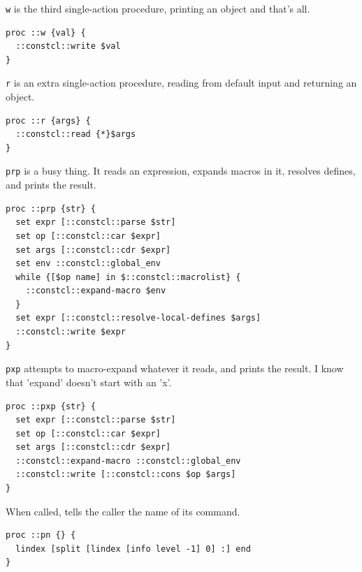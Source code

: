 \documentclass[twoside,9pt]{report}
\begin{document}
\texttt{w} is the third single-action procedure, printing an object and that's all.

\noindent\makebox[\linewidth]{\rule{\linewidth}{0.4pt}}
\begin{lstlisting}
proc ::w {val} {
  ::constcl::write $val
}
\end{lstlisting}
\noindent\makebox[\linewidth]{\rule{\linewidth}{0.4pt}}

\texttt{r} is an extra single-action procedure, reading from default input and returning an object.

\noindent\makebox[\linewidth]{\rule{\linewidth}{0.4pt}}
\begin{lstlisting}
proc ::r {args} {
  ::constcl::read {*}$args
}
\end{lstlisting}
\noindent\makebox[\linewidth]{\rule{\linewidth}{0.4pt}}

\texttt{prp} is a busy thing. It reads an expression, expands macros in it, resolves defines, and prints the result.

\noindent\makebox[\linewidth]{\rule{\linewidth}{0.4pt}}
\begin{lstlisting}
proc ::prp {str} {
  set expr [::constcl::parse $str]
  set op [::constcl::car $expr]
  set args [::constcl::cdr $expr]
  set env ::constcl::global_env
  while {[$op name] in $::constcl::macrolist} {
    ::constcl::expand-macro $env
  }
  set expr [::constcl::resolve-local-defines $args]
  ::constcl::write $expr
}
\end{lstlisting}
\noindent\makebox[\linewidth]{\rule{\linewidth}{0.4pt}}

\texttt{pxp} attempts to macro-expand whatever it reads, and prints the result. I know that 'expand' doesn't start with an 'x'.

\noindent\makebox[\linewidth]{\rule{\linewidth}{0.4pt}}
\begin{lstlisting}
proc ::pxp {str} {
  set expr [::constcl::parse $str]
  set op [::constcl::car $expr]
  set args [::constcl::cdr $expr]
  ::constcl::expand-macro ::constcl::global_env
  ::constcl::write [::constcl::cons $op $args]
}
\end{lstlisting}
\noindent\makebox[\linewidth]{\rule{\linewidth}{0.4pt}}

When called, tells the caller the name of its command.

\noindent\makebox[\linewidth]{\rule{\linewidth}{0.4pt}}
\begin{lstlisting}
proc ::pn {} {
  lindex [split [lindex [info level -1] 0] :] end
}
\end{lstlisting}
\noindent\makebox[\linewidth]{\rule{\linewidth}{0.4pt}}
\end{document}
